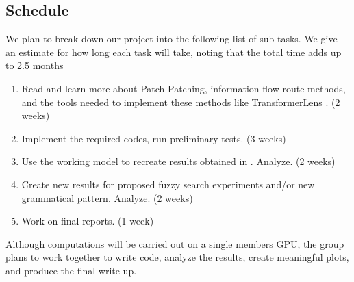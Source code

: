 \documentclass[11pt,a4paper]{article}
\newcommand{\blue}{\color{black}{}}
\newcommand{\black}{\color{black}{}}
\newcommand{\mb}{\color{black}{}}
\begin{document}
\black

\subsection{Schedule}

\mb
We plan to break down our project into the following list of sub tasks. We give an estimate for how long each task will take, noting that the total time adds up to 2.5 months

\blue 
\begin{enumerate}
    \item Read and learn more about Patch Patching, information flow route methods, and the tools needed to implement these methods like TransformerLens \cite{NB22}.  (2 weeks)
    \item Implement the required codes, run preliminary tests. (3 weeks)
    \item  Use the working model to recreate results obtained in \cite{ZYZEP25}. Analyze. (2 weeks) 
    \item Create new results for proposed fuzzy search experiments and/or new grammatical pattern. Analyze. (2 weeks)
    \item Work on final reports. (1 week)
\end{enumerate}

\mb 
Although computations will be carried out on a single members GPU, the group plans to work together to write code, analyze the results, create meaningful plots, and produce the final write up.
\end{document}
